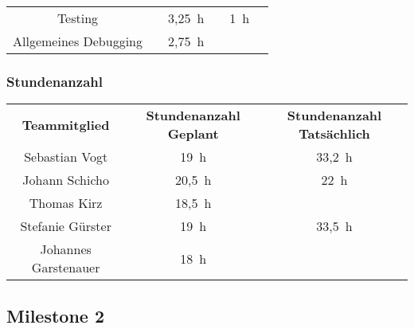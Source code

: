 \begin{landscape}
\begin{center}
\begin{tabular}{ c c c c c c }
			Testing & & 3,25~h & & 1~h & \\
			
			Allgemeines Debugging & & 2,75~h & & &
		\end{tabular}
	\end{center}
	
	\subsubsection{Stundenanzahl}
	\begin{center}
		\begin{tabular}{ c c c }
			\textbf{Teammitglied} & \textbf{Stundenanzahl Geplant} & \textbf{Stundenanzahl Tatsächlich}\\
			Sebastian Vogt & 19~h & 33,2~h \\
			Johann Schicho & 20,5~h & 22~h \\
			Thomas Kirz & 18,5~h & \\
			Stefanie Gürster & 19~h & 33,5~h \\
			Johannes Garstenauer & 18~h & 
		\end{tabular}
	\end{center}
	
	\subsection{Milestone 2}

\end{landscape}
